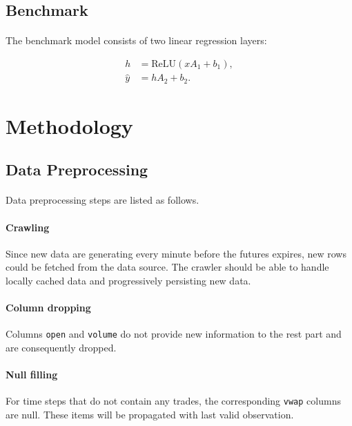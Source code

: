 \documentclass[12pt, letterpaper]{article}
\begin{document}
\subsection{Benchmark}

\paragraph{}
The benchmark model consists of two linear regression layers:

\begin{align*}
    h&=\mathrm{ReLU}\left(xA_1+b_1\right), \\
    \hat y&=hA_2+b_2.
\end{align*}

\section{Methodology} %

\subsection{Data Preprocessing}

\paragraph{}
Data preprocessing steps are listed as follows.

\paragraph{Crawling} Since new data are generating every minute before the futures expires, new rows could be fetched from the data source. The crawler should be able to handle locally cached data and progressively persisting new data.

\paragraph{Column dropping} Columns \texttt{open} and \texttt{volume} do not provide new information to the rest part and are consequently dropped.

\paragraph{Null filling} For time steps that do not contain any trades, the corresponding \texttt{vwap} columns are null. These items will be propagated with last valid observation.
\end{document}
